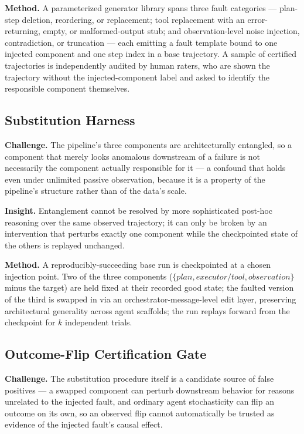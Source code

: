 \documentclass[11pt]{article}
\begin{document}
\textbf{Method.} A parameterized generator library spans three fault categories --- plan-step deletion, reordering, or replacement; tool replacement with an error-returning, empty, or malformed-output stub; and observation-level noise injection, contradiction, or truncation --- each emitting a fault template bound to one injected component and one step index in a base trajectory. A sample of certified trajectories is independently audited by human raters, who are shown the trajectory without the injected-component label and asked to identify the responsible component themselves.

\subsection{Substitution Harness}
\textbf{Challenge.} The pipeline's three components are architecturally entangled, so a component that merely looks anomalous downstream of a failure is not necessarily the component actually responsible for it --- a confound that holds even under unlimited passive observation, because it is a property of the pipeline's structure rather than of the data's scale.

\textbf{Insight.} Entanglement cannot be resolved by more sophisticated post-hoc reasoning over the same observed trajectory; it can only be broken by an intervention that perturbs exactly one component while the checkpointed state of the others is replayed unchanged.

\textbf{Method.} A reproducibly-succeeding base run is checkpointed at a chosen injection point. Two of the three components ($\{plan, executor/tool, observation\}$ minus the target) are held fixed at their recorded good state; the faulted version of the third is swapped in via an orchestrator-message-level edit layer, preserving architectural generality across agent scaffolds; the run replays forward from the checkpoint for $k$ independent trials.

\subsection{Outcome-Flip Certification Gate}
\textbf{Challenge.} The substitution procedure itself is a candidate source of false positives --- a swapped component can perturb downstream behavior for reasons unrelated to the injected fault, and ordinary agent stochasticity can flip an outcome on its own, so an observed flip cannot automatically be trusted as evidence of the injected fault's causal effect.
\end{document}
